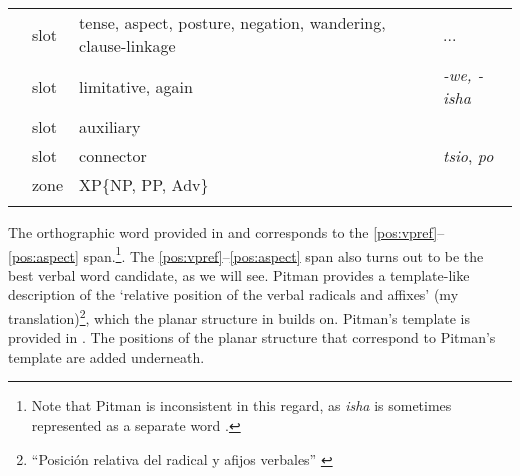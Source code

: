 \documentclass[output=paper,hidelinks]{langscibook}
\begin{document}
\begin{table}
\begin{tabular}{Slp{7.5cm}l}
\label{pos:tamesuf} & slot      & tense, aspect, posture, negation, wandering, clause-linkage  & ...   \\

\label{pos:aspect}  & slot &  limitative, again  & \textit{-we, -isha}   \\

\label{pos:auxiliary}   & slot      & auxiliary     &        \\

\label{pos:connect3}    & slot      & connector & \textit{tsio}, \textit{po}    \\

\label{pos:XP3}  & zone  & XP\{NP, PP, Adv\}   &   \\
\lspbottomrule
\end{tabular}
\end{table}

The orthographic word provided in \citet[108]{pitman:1980:araonasketch} and \citet{emkow:2019:araonarepublish} corresponds to the \ref{pos:vpref}--\ref{pos:aspect} span.\footnote{Note that Pitman is inconsistent in this regard, as \textit{isha} is sometimes represented as a separate word \citep[38]{pitman:1980:araonasketch}.}. The \ref{pos:vpref}--\ref{pos:aspect} span also turns out to be the best verbal word candidate, as we will see.
Pitman provides a template-like description of the `relative position of the verbal radicals and affixes' (my translation)\footnote{``Posición relativa del radical y afijos verbales'' \citep[28]{pitman:1980:araonasketch}}, which the planar structure in  builds on. Pitman's template is provided in . The positions of the planar structure that correspond to Pitman's template are added underneath.

\begin{table}
\caption{Pitman's analysis of Araona}
\label{tab:pitmanaraona}
\end{table}
\end{document}
